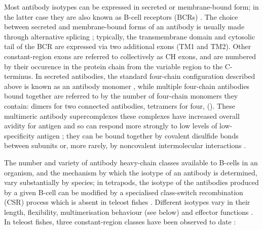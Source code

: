Most antibody isotypes can be expressed in secreted or membrane-bound form; in the latter case they are also known as B-cell receptors (BCRs) \parencite{bengten2015fishantibodies}. The choice between secreted and membrane-bound forms of an antibody is usually made through alternative splicing \parencite{bengten2015fishantibodies,mashoof2016immunoglobulins}; typically, the transmembrane domain and cytosolic tail of the BCR are expressed via two additional exons (TM1 and TM2). Other constant-region exons are referred to collectively as CH exons, and are numbered by their occurence in the protein chain from the variable region to the C-terminus. In secreted antibodies, the standard four-chain configuration described above is known as an antibody monomer \parencite{mix2006immunoglobulins}, while multiple four-chain antibodies bound together are referred to by the number of four-chain monomers they contain: dimers for two connected antibodies, tetramers for four, \etc \parencite{mix2006immunoglobulins,schroeder2010immunoglobulins} (). These multimeric antibody supercomplexes these complexes have increased overall avidity for antigen and so can respond more strongly to low levels of low-specificity antigen \parencite{mix2006immunoglobulins}; they can be bound together by covalent disulfide bonds between subunits \parencite{schroeder2010immunoglobulins} or, more rarely, by noncovalent intermolecular interactions \parencite{zhang2010igtgut}.

The number and variety of antibody heavy-chain classes available to B-cells in an organism, and the mechanism by which the isotype of an antibody is determined, vary substantially by species; in tetrapods, the isotype of the antibodies produced by a given B-cell can be modified by a specialised class-switch recombination (CSR) process which is absent in teleost fishes \parencite{senger2015switching}. Different isotypes vary in their length, flexibility, multimerisation behaviour (see below) and effector functions \parencite{schroeder2010immunoglobulins,senger2015switching}. In teleost fishes, three constant-region classes have been observed to date \parencite{bengten2015fishantibodies,mashoof2016immunoglobulins,fillatreau2013astonishing}:

